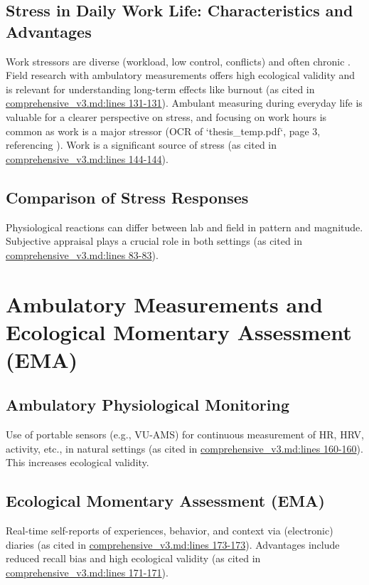 \documentclass[11pt, a4paper]{report}
\newcommand{\mdcite}[3]{\href{run:./sources/#1}{\url{#1}:lines #2-#3}} %
\begin{document}
\subsection{Stress in Daily Work Life: Characteristics and Advantages}
\label{subsec:work_stress} %
Work stressors are diverse (workload, low control, conflicts) and often chronic \cite{Karasek1979}. Field research with ambulatory measurements offers high ecological validity and is relevant for understanding long-term effects like burnout \cite{TrullEbnerPriemer2013} (as cited in \mdcite{comprehensive_v3.md}{131}{131}). Ambulant measuring during everyday life is valuable for a clearer perspective on stress, and focusing on work hours is common as work is a major stressor (OCR of `thesis_temp.pdf`, page 3, referencing \cite{Spector2002}). Work is a significant source of stress \cite{Spector2002} (as cited in \mdcite{comprehensive_v3.md}{144}{144}).

\subsection{Comparison of Stress Responses}
\label{subsec:comparison_responses} %
Physiological reactions can differ between lab and field in pattern and magnitude. Subjective appraisal plays a crucial role in both settings \cite{LazarusFolkman1984} (as cited in \mdcite{comprehensive_v3.md}{83}{83}).

\section{Ambulatory Measurements and Ecological Momentary Assessment (EMA)}
\label{sec:ambulatory_measurements_ema}

\subsection{Ambulatory Physiological Monitoring}
\label{subsec:ambulatory_monitoring}
Use of portable sensors (e.g., VU-AMS) for continuous measurement of HR, HRV, activity, etc., in natural settings \cite{FahrenbergMyrtek1996} (as cited in \mdcite{comprehensive_v3.md}{160}{160}). This increases ecological validity.

\subsection{Ecological Momentary Assessment (EMA)}
\label{subsec:ema}
Real-time self-reports of experiences, behavior, and context via (electronic) diaries \cite{ShiffmanEtAl2008} (as cited in \mdcite{comprehensive_v3.md}{173}{173}). Advantages include reduced recall bias and high ecological validity \cite{TrullEbnerPriemer2013} (as cited in \mdcite{comprehensive_v3.md}{171}{171}).
\end{document}
